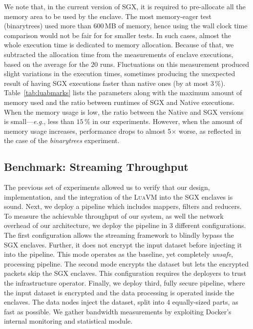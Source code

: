 We note that, in the current version of SGX, it is required to pre-allocate all the memory area to be used by the enclave.
The most memory-eager test (\textsf{binarytrees}) used more than $600$\,MB of memory, hence using the wall clock time comparison would not be fair for for smaller tests.
In such cases, almost the whole execution time is dedicated to memory allocation.
Because of that, we subtracted the allocation time from the measurements of enclave executions, based on the average for the $20$ runs.
Fluctuations on this measurement produced slight variations in the execution times, sometimes producing the unexpected result of having SGX executions faster than native ones (by at most $3$\,\%).
Table~\ref{tab:luabmarks} lists the parameters along with the maximum amount of memory used and the ratio between runtimes of SGX and Native executions.
When the memory usage is low, the ratio between the Native and SGX versions is small---\emph{e.g.}, less than $15$\,\% in our experiments.
However, when the amount of memory usage increases, performance drops to almost 5$\times$ worse, as reflected in the case of the \emph{binarytrees} experiment.

\subsection{Benchmark: Streaming Throughput}

The previous set of experiments allowed us to verify that our design, implementation, and the integration of the \textsc{LuaVM} into the SGX enclaves is sound.
Next, we deploy a \SYS{} pipeline which includes mappers, filters and reducers.
To measure the achievable throughput of our system, as well the network overhead of our architecture,
we deploy the \SYS{} pipeline in 3 different configurations.
The first configuration allows the streaming framework to blindly bypass the SGX enclaves.
Further, it does not encrypt the input dataset before injecting it into the pipeline.
This mode operates as the baseline, yet completely \emph{unsafe}, processing pipeline.
The second mode encrypts the dataset but lets the encrypted packets skip the SGX enclaves.
This configuration requires the deployers to trust the infrastructure operator.
Finally, we deploy third, fully secure pipeline, where the input dataset is encrypted and the data processing is operated inside the enclaves.
The data nodes inject the dataset, split into 4 equally-sized parts, as fast as possible.
We gather bandwidth measurements by exploiting Docker's internal monitoring and statistical module.

